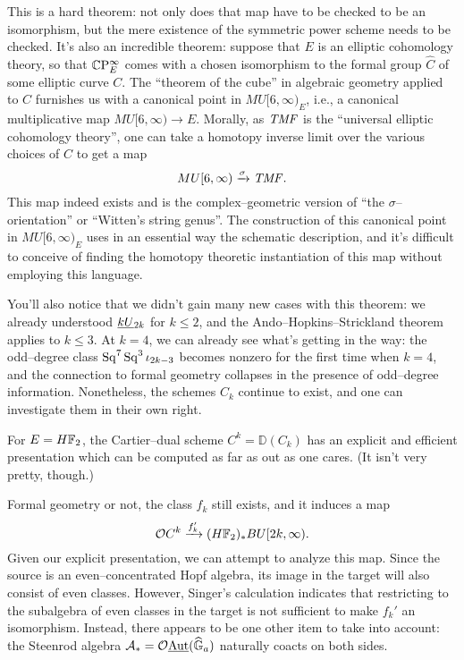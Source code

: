 This is a hard theorem: not only does that map have to be checked to be an isomorphism, but the mere existence of the symmetric power scheme needs to be checked.  It's also an incredible theorem: suppose that $E$ is an elliptic cohomology theory, so that $\mathbb{C}\mathrm P^\infty_E$ comes with a chosen isomorphism to the formal group $\widehat{C}$ of some elliptic curve $C$.    The ``theorem of the cube'' in algebraic geometry applied to $C$ furnishes us with a canonical point in $MU[6, \infty)_E$, i.e., a canonical multiplicative map $MU[6, \infty) \to E$.  Morally, as $\mathit{TMF}$ is the ``universal elliptic cohomology theory'', one can take a homotopy inverse limit over the various choices of $C$ to get a map \[MU[6, \infty) \xrightarrow{\sigma} \mathit{TMF}.\]  This map indeed exists and is the complex--geometric version of ``the $\sigma$--orientation'' or ``Witten's string genus''.  The construction of this canonical point in $MU[6, \infty)_E$ uses in an essential way the schematic description, and it's difficult to conceive of finding the homotopy theoretic instantiation of this map without employing this language.

You'll also notice that we didn't gain many new cases with this theorem: we already understood $\smash{\underline{kU}}_{2k}$ for $k \le 2$, and the Ando--Hopkins--Strickland theorem applies to $k \le 3$.  At $k = 4$, we can already see what's getting in the way: the odd--degree class $\operatorname{Sq}^7 \operatorname{Sq}^3 \iota_{2k-3}$ becomes nonzero for the first time when $k = 4$, and the connection to formal geometry collapses in the presence of odd--degree information.  Nonetheless, the schemes $C_k$ continue to exist, and one can investigate them in their own right.

\begin{theorem}
For $E = H\mathbb F_2$, the Cartier--dual scheme $C^k = \mathbb{D}(C_k)$ has an explicit and efficient presentation which can be computed as far as out as one cares.  (It isn't very pretty, though.)
\end{theorem}

Formal geometry or not, the class $f_k$ still exists, and it induces a map \[\mathcal{O} C^k \xrightarrow{f_k'} (H\mathbb F_2)_* BU[2k, \infty).\]  Given our explicit presentation, we can attempt to analyze this map.  Since the source is an even--concentrated Hopf algebra, its image in the target will also consist of even classes.  However, Singer's calculation indicates that restricting to the subalgebra of even classes in the target is not sufficient to make $f_k'$ an isomorphism.  Instead, there appears to be one other item to take into account: the Steenrod algebra $\mathcal{A}_* = \mathcal{O} \underline{\operatorname{Aut}}(\widehat{\mathbb G}_a)$ naturally coacts on both sides.

